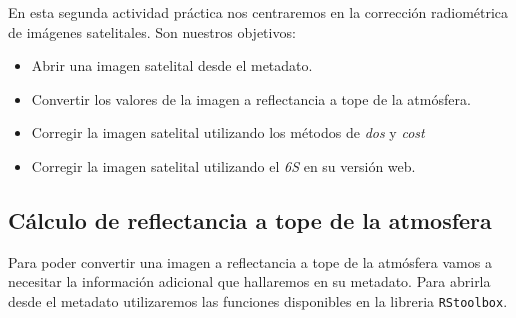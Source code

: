 
En esta segunda actividad pr\'actica nos centraremos en la correcci\'on radiom\'etrica
de im\'agenes satelitales. Son nuestros objetivos:

\begin{itemize}
    \item Abrir una imagen satelital desde el metadato.
    \item Convertir los valores de la imagen a reflectancia a tope de la
        atm\'osfera.
    \item Corregir la imagen satelital utilizando los m\'etodos de \emph{dos} y
        \emph{cost}
    \item Corregir la imagen satelital utilizando el \emph{6S} en su versi\'on web.
\end{itemize}

\subsection{C\'alculo de reflectancia a tope de la atmosfera}

Para poder convertir una imagen a reflectancia a tope de la atm\'osfera vamos a
necesitar la informaci\'on adicional que hallaremos en su metadato.
Para abrirla desde el metadato utilizaremos las funciones
disponibles en la libreria \texttt{RStoolbox}.

